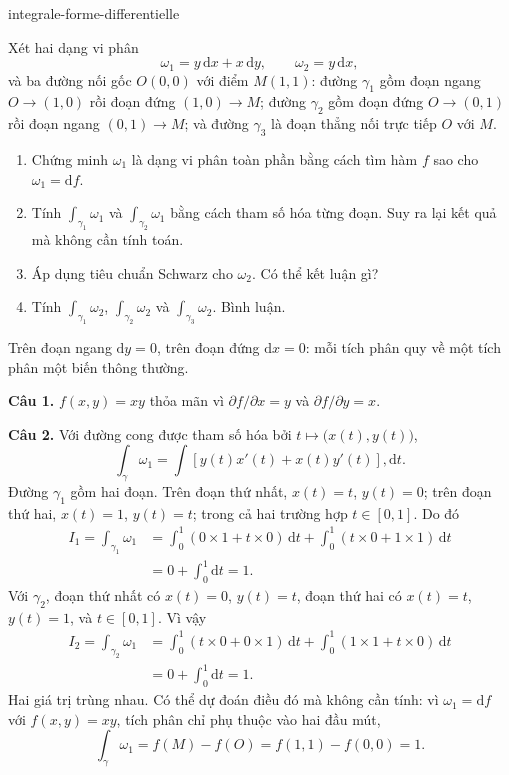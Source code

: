 
\begin{exo}{integrale-forme-differentielle}

Xét hai dạng vi phân
\[
\omega_1 = y\,\mathrm{d}x + x\,\mathrm{d}y,
\qquad
\omega_2 = y\,\mathrm{d}x,
\]
và ba đường nối gốc $O(0,0)$ với điểm $M(1,1)$: đường $\gamma_1$ gồm đoạn
ngang $O\to(1,0)$ rồi đoạn đứng $(1,0)\to M$; đường $\gamma_2$ gồm đoạn đứng
$O\to(0,1)$ rồi đoạn ngang $(0,1)\to M$; và đường $\gamma_3$ là đoạn thẳng
nối trực tiếp $O$ với $M$.

\begin{enumerate}
\item Chứng minh $\omega_1$ là dạng vi phân toàn phần bằng cách tìm hàm $f$ sao cho $\omega_1 = \mathrm{d}f$.
\item Tính $\int_{\gamma_1}\omega_1$ và $\int_{\gamma_2}\omega_1$ bằng cách tham số hóa từng đoạn. Suy ra lại kết quả mà không cần tính toán.
\item Áp dụng tiêu chuẩn Schwarz cho $\omega_2$. Có thể kết luận gì?
\item Tính $\int_{\gamma_1}\omega_2$, $\int_{\gamma_2}\omega_2$ và $\int_{\gamma_3}\omega_2$. Bình luận.
\end{enumerate}

\begin{indication}
Trên đoạn ngang $\mathrm{d}y = 0$, trên đoạn đứng $\mathrm{d}x = 0$:
mỗi tích phân quy về một tích phân một biến thông thường.
\end{indication}

\begin{solution}
\textbf{Câu 1.} $f(x,y) = xy$ thỏa mãn vì $\partial f/\partial x = y$ và $\partial f/\partial y = x$.

\textbf{Câu 2.} Với đường cong được tham số hóa bởi $t\mapsto\bigl(x(t),y(t)\bigr)$,
\[
\int_\gamma\omega_1
= \int \left[y(t)x'(t)+x(t)y'(t)\right],\mathrm{d}t.
\]
Đường $\gamma_1$ gồm hai đoạn. Trên đoạn thứ nhất, $x(t)=t$, $y(t)=0$;
trên đoạn thứ hai, $x(t)=1$, $y(t)=t$; trong cả hai trường hợp $t\in[0,1]$. Do đó
\[
\begin{aligned}
I_1=\int_{\gamma_1}\omega_1
&= \int_0^1(0\times1+t\times0)\,\mathrm{d}t
+\int_0^1(t\times0+1\times1)\,\mathrm{d}t\\
&=0+\int_0^1\mathrm{d}t=1.
\end{aligned}
\]
Với $\gamma_2$, đoạn thứ nhất có $x(t)=0$, $y(t)=t$, đoạn thứ hai có
$x(t)=t$, $y(t)=1$, và $t\in[0,1]$. Vì vậy
\[
\begin{aligned}
I_2=\int_{\gamma_2}\omega_1
&= \int_0^1(t\times0+0\times1)\,\mathrm{d}t
+\int_0^1(1\times1+t\times0)\,\mathrm{d}t\\
&=0+\int_0^1\mathrm{d}t=1.
\end{aligned}
\]
Hai giá trị trùng nhau. Có thể dự đoán điều đó mà không cần tính: vì
$\omega_1=\mathrm{d}f$ với $f(x,y)=xy$, tích phân chỉ phụ thuộc vào hai đầu mút,
\[
\int_\gamma\omega_1=f(M)-f(O)=f(1,1)-f(0,0)=1.
\]


\end{solution}
\end{exo}
